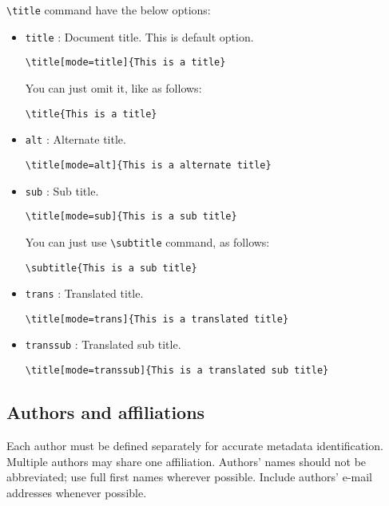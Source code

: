 \documentclass[%
twocolumn
]{ceurart}
\begin{document}
\verb|\title|
command have the below options:
\begin{itemize}
\item
\verb|title|
: Document title. This is default option.
\begin{lstlisting}[language={[latex]TeX}]
\title[mode=title]{This is a title}
\end{lstlisting}

You can just omit it, like as follows:
\begin{lstlisting}[language={[latex]TeX}]
\title{This is a title}
\end{lstlisting}

\item
\verb|alt|
: Alternate title.
\begin{lstlisting}[language={[latex]TeX}]
\title[mode=alt]{This is a alternate title}
\end{lstlisting}

\item
\verb|sub|
: Sub title.
\begin{lstlisting}[language={[latex]TeX}]
\title[mode=sub]{This is a sub title}
\end{lstlisting}
You can just use
\verb|\subtitle|
 command, as follows:
\begin{lstlisting}[language={[latex]TeX}]
\subtitle{This is a sub title}
\end{lstlisting}

\item
\verb|trans|
: Translated title.
\begin{lstlisting}[language={[latex]TeX}]
\title[mode=trans]{This is a translated title}
\end{lstlisting}

\item
\verb|transsub|
: Translated sub title.
\begin{lstlisting}[language={[latex]TeX}]
\title[mode=transsub]{This is a translated sub title}
\end{lstlisting}
\end{itemize}

\subsection{Authors and affiliations}

Each author must be defined separately for accurate metadata identification.
Multiple authors may share one affiliation.
Authors' names should not be abbreviated; use full first names wherever possible.
Include authors' e-mail addresses whenever possible.
\end{document}
